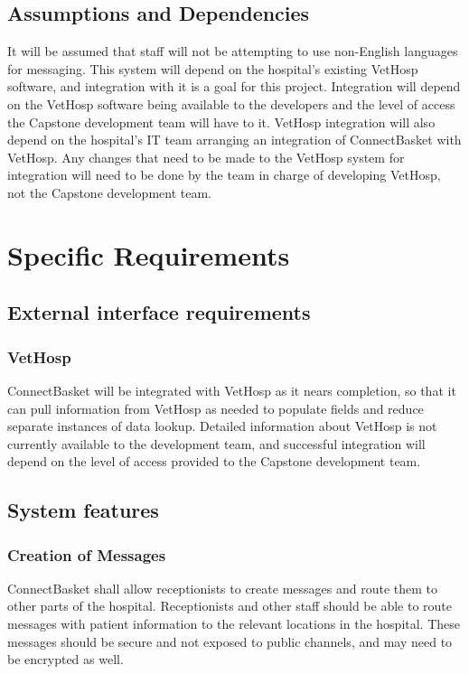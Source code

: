 \documentclass[onecolumn, draftclsnofoot,10pt, compsoc]{IEEEtran}
\begin{document}
\subsection{Assumptions and Dependencies}
It will be assumed that staff will not be attempting to use non-English languages for messaging. This system will depend on the hospital's existing VetHosp software, and integration with it is a goal for this project. Integration will depend on the VetHosp software being available to the developers and the level of access the Capstone development team will have to it. VetHosp integration will also depend on the hospital's IT team arranging an integration of ConnectBasket with VetHosp. Any changes that need to be made to the VetHosp system for integration will need to be done by the team in charge of developing VetHosp, not the Capstone development team.

\section{Specific Requirements}

\subsection{External interface requirements}

\subsubsection{VetHosp}
ConnectBasket will be integrated with VetHosp as it nears completion, so that it can pull information from VetHosp as needed to populate fields and reduce separate instances of data lookup. Detailed information about VetHosp is not currently available to the development team, and successful integration will depend on the level of access provided to the Capstone development team.

\subsection{System features}

\subsubsection{Creation of Messages}
ConnectBasket shall allow receptionists to create messages and route them to other parts of the hospital. Receptionists and other staff should be able to route messages with patient information to the relevant locations in the hospital. These messages should be secure and not exposed to public channels, and may need to be encrypted as well.
\end{document}
